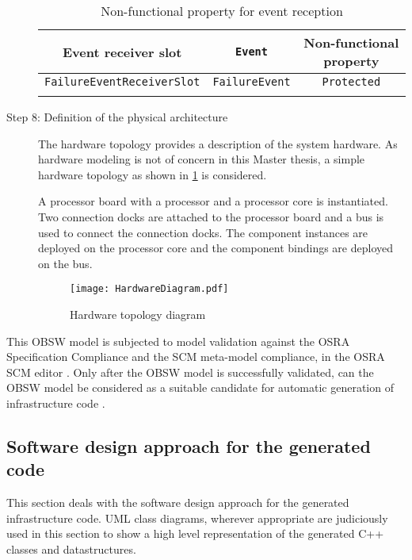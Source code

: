 \begin{description}
\begin{table}[]
	\centering
	\caption{Non-functional property for event reception}
	\label{table: NFP ER Port}
	\begin{tabular}{ccc}
		\hline
		\multicolumn{1}{|c|}{\textbf{Event receiver slot}} & \multicolumn{1}{c|}{\textbf{\texttt{Event}}} & \multicolumn{1}{c|}{\textbf{Non-functional property}} \\ \hline
		\multicolumn{1}{|c|}{\texttt{FailureEventReceiverSlot}} & \multicolumn{1}{c|}{\texttt{FailureEvent}} & \multicolumn{1}{c|}{\texttt{Protected}} \\ \hline
		\multicolumn{1}{l}{} & \multicolumn{1}{l}{} & \multicolumn{1}{l}{}
	\end{tabular}
\end{table}

\item [Step 8: Definition of the physical architecture] The hardware topology provides a description of the system hardware. As hardware modeling is not of concern in this Master thesis, a simple hardware topology as shown in \cref{fig: Ex. Hardware topology} is considered. 

A processor board with a processor and a processor core is instantiated. Two connection docks are attached to the processor board and a bus is used to connect the connection docks. The component instances are deployed on the processor core and the component bindings are deployed on the bus.

\begin{figure}[h]
	\centering
	\texttt{[image: HardwareDiagram.pdf]}
	\caption{Hardware topology diagram}
	\label{fig: Ex. Hardware topology}
\end{figure}
 
\end{description}

This OBSW model is subjected to model validation against the OSRA Specification Compliance and the SCM meta-model compliance, in the OSRA SCM editor \cite{OSRAEditor}. Only after the OBSW model is successfully validated, can the OBSW model be considered as a suitable candidate for automatic generation of infrastructure code \cite{OSRAEditor}.  
   
\subsection{Software design approach for the generated code}
\label{subsection: Software design approach}
This section deals with the software design approach for the generated infrastructure code. UML class diagrams, wherever appropriate are judiciously used in this section to show a high level representation of the generated C++ classes and datastructures. 

